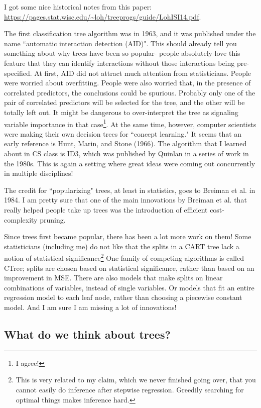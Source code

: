 I got some nice historical notes from this paper: \url{https://pages.stat.wisc.edu/~loh/treeprogs/guide/LohISI14.pdf}. 

The first classification tree algorithm was in 1963, and it was published under the name ``automatic interaction detection (AID)". This should already tell you something about why trees have been so popular- people absolutely love this feature that they can identify interactions without those interactions being pre-specified. At first, AID did not attract much attention from statisticians. People were worried about overfitting. People were also worried that, in the presence of correlated predictors, the conclusions could be spurious. Probably only one of the pair of correlated predictors will be selected for the tree, and the other will be totally left out. It might be dangerous to over-interpret the tree as signaling variable importance in that case\footnote{I agree!}. At the same time, however, computer scientists were making their own decision trees for ``concept learning." It seems that an early reference is Hunt, Marin, and Stone (1966). The algorithm that I learned about in CS class is ID3, which was published by Quinlan in a series of work in the 1980s. This is again a setting where great ideas were coming out concurrently in multiple disciplines!

The credit for ``popularizing" trees, at least in statistics, goes to Breiman et al. in 1984. I am pretty sure that one of the main innovations by Breiman et al. that really helped people take up trees was the introduction of efficient cost-complexity pruning. 

Since trees first became popular, there has been a lot more work on them! Some statisticians (including me) do not like that the splits in a CART tree lack a notion of statistical significance\footnote{This is very related to my claim, which we never finished going over, that you cannot easily do inference after stepwise regression. Greedily searching for optimal things makes inference hard.} One family of competing algorithms is called CTree; splits are chosen based on statistical significance, rather than based on an improvement in MSE. There are also models that make splits on linear combinations of variables, instead of single variables. Or models that fit an entire regression model to each leaf node, rather than choosing a piecewise constant model. And I am sure I am missing a lot of innovations! 

\subsection{What do we think about trees?}


